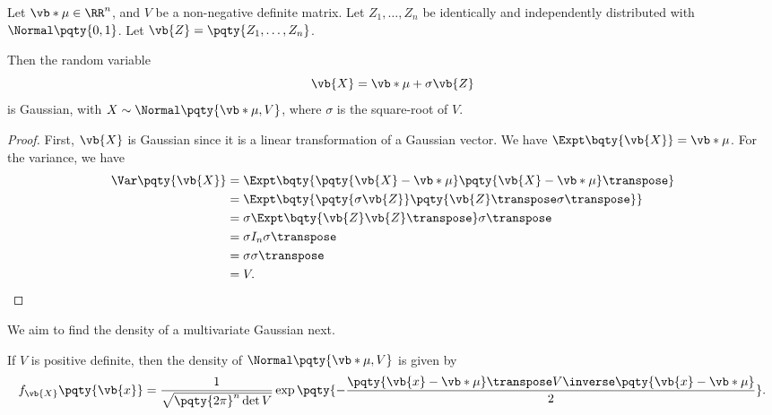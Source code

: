 \begin{lemma}
    \label{lem:construction-multivariate-gaussian}%
    Let \(\vb*{\mu} \in \RR^n\), and \(V\) be a non-negative definite matrix. Let \(Z_1, \ldots, Z_n\) be identically and independently distributed with \(\Normal\pqty{0, 1}\). Let \(\vb{Z} = \pqty{Z_1, \ldots, Z_n}\).

    Then the random variable
    \[
        \vb{X} = \vb*{\mu} + \sigma \vb{Z}
    \]
    is Gaussian, with \(X \sim \Normal\pqty{\vb*{\mu}, V}\), where \(\sigma\) is the square-root of \(V\).
\end{lemma}

\begin{proof}
    First, \(\vb{X}\) is Gaussian since it is a linear transformation of a Gaussian vector. We have \(\Expt\bqty{\vb{X}} = \vb*{\mu}\). For the variance, we have
    \begin{align*}
        \Var\pqty{\vb{X}} &= \Expt\bqty{\pqty{\vb{X} - \vb*{\mu}} \pqty{\vb{X} - \vb*{\mu}}\transpose} \\
        &= \Expt\bqty{\pqty{\sigma \vb{Z}} \pqty{\vb{Z}\transpose \sigma\transpose}} \\
        &= \sigma \Expt\bqty{\vb{Z} \vb{Z}\transpose} \sigma\transpose \\
        &= \sigma I_n \sigma\transpose \\
        &= \sigma \sigma\transpose \\
        &= V.
    \end{align*}
\end{proof}

We aim to find the density of a multivariate Gaussian next.

\begin{proposition}
    If \(V\) is positive definite, then the density of \(\Normal\pqty{\vb*{\mu}, V}\) is given by
    \[
        f_{\vb{X}}\pqty{\vb{x}} = \frac{1}{\sqrt{\pqty{2\pi}^n \det V}} \exp\pqty{- \frac{\pqty{\vb{x} - \vb*{\mu}}\transpose V\inverse \pqty{\vb{x} - \vb*{\mu}}}{2}}.
    \]
\end{proposition}

